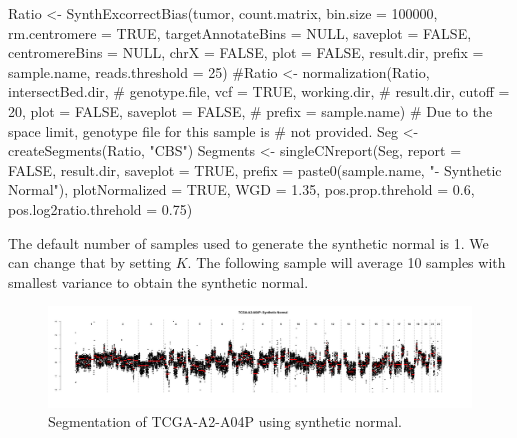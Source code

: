 \documentclass{article}
\begin{document}
\begin{Schunk}
\begin{Sinput}
 Ratio <- SynthExcorrectBias(tumor, count.matrix,
       bin.size = 100000,
       rm.centromere = TRUE,
       targetAnnotateBins = NULL, saveplot = FALSE,
       centromereBins = NULL, chrX = FALSE, plot = FALSE,
       result.dir, prefix = sample.name, reads.threshold = 25)
 #Ratio <- normalization(Ratio, intersectBed.dir,
 # genotype.file, vcf = TRUE, working.dir,
 # result.dir, cutoff = 20, plot = FALSE, saveplot = FALSE,
 # prefix = sample.name)
 # Due to the space limit, genotype file for this sample is
 # not provided.
 Seg <- createSegments(Ratio, "CBS")
 Segments <- singleCNreport(Seg, report = FALSE, result.dir,
        saveplot = TRUE,
        prefix = paste0(sample.name, "- Synthetic Normal"),
        plotNormalized = TRUE, WGD = 1.35,
        pos.prop.threhold = 0.6, pos.log2ratio.threhold = 0.75)
\end{Sinput}
\end{Schunk}

The default number of samples used to generate the synthetic normal is 1. We can change that by setting $K$. The following sample will average 10 samples with smallest variance to obtain the synthetic normal.

\begin{Schunk}
\end{Schunk}

\begin{figure}
\begin{center}
\includegraphics[width=\textwidth]{figure/multiple2-1}
\end{center}
\caption{Segmentation of TCGA-A2-A04P using synthetic normal.}
\label{synthetic}
\end{figure}
\end{document}
